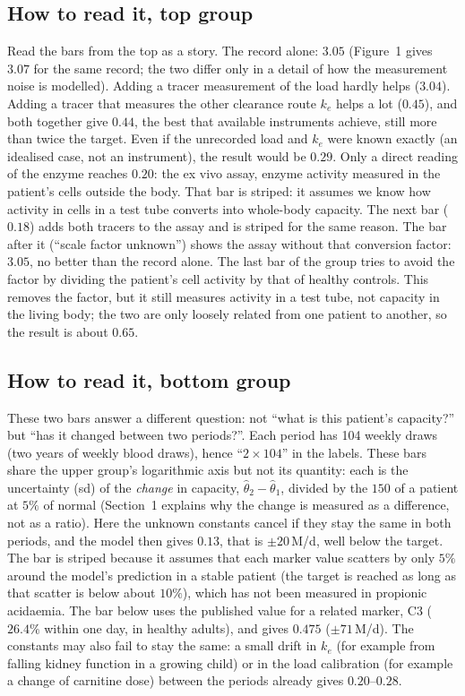 \documentclass[11pt,a4paper]{article}
\newcommand{\um}{\,\textmu M/d}
\begin{document}
\subsection{How to read it, top group} Read the bars from the top as a story. The record alone:
$3.05$ (Figure~1 gives $3.07$ for the same record; the two differ only in a detail of how the
measurement noise is modelled). Adding a tracer measurement of the load hardly helps ($3.04$).
Adding a tracer that measures the other clearance route $k_e$ helps a lot ($0.45$), and both
together give $0.44$, the best that available instruments achieve, still more than twice the
target. Even if the unrecorded load and $k_e$ were known exactly (an idealised case, not an
instrument), the result would be $0.29$. Only a direct reading of the enzyme reaches $0.20$: the
ex vivo assay, enzyme activity measured in the patient's cells outside the body. That bar is
striped: it assumes we know how activity in cells in a test tube converts into whole-body
capacity. The next bar ($0.18$) adds both tracers to the assay and is striped for the same
reason. The bar after it (``scale factor unknown'') shows the assay without that conversion
factor: $3.05$, no better than the record alone. The last bar of the group tries to avoid the
factor by dividing the patient's cell activity by that of healthy controls. This removes the
factor, but it still measures activity in a test tube, not capacity in the living body; the two
are only loosely related from one patient to another, so the result is about $0.65$.

\subsection{How to read it, bottom group} These two bars answer a different question: not
``what is this patient's capacity?'' but ``has it changed between two periods?''. Each period has
104 weekly draws (two years of weekly blood draws), hence ``$2\times104$'' in the labels. These
bars share the upper group's logarithmic axis but not its quantity: each is the uncertainty (sd) of the \emph{change} in
capacity, $\hat\theta_2-\hat\theta_1$, divided by the $150$ of a patient at $5\%$ of normal (Section~1
explains why the change is measured as a difference, not as a ratio). Here the unknown constants
cancel if they stay the same in both periods, and the model then gives $0.13$, that is
$\pm20$\um, well below the target. The bar is striped because it assumes that each marker value
scatters by only $5\%$ around the model's prediction in a stable patient (the target is reached as
long as that scatter is below about $10\%$), which has not been measured in propionic acidaemia.
The bar below uses the published value for a related marker, C3 ($26.4\%$ within one day, in
healthy adults), and gives $0.475$ ($\pm71$\um). The constants may also fail to stay the same: a small drift in $k_e$
(for example from falling kidney function in a growing child) or in the load calibration (for
example a change of carnitine dose) between the periods already gives $0.20$--$0.28$.
\end{document}
